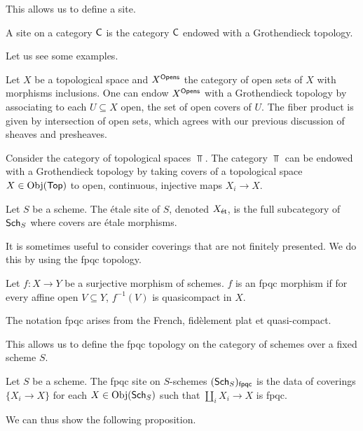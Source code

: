 This allows us to define a site. 
\begin{definition}[Site]\label{def: site}
    A site on a category $\mathsf{C}$ is the category $\mathsf{C}$ endowed with a Grothendieck topology. 
\end{definition}
Let us see some examples.
\begin{example}
    Let $X$ be a topological space and $X^{\mathsf{Opens}}$ the category of open sets of $X$ with morphisms inclusions. One can endow $X^{\mathsf{Opens}}$ with a Grothendieck topology by associating to each $U\subseteq X$ open, the set of open covers of $U$. The fiber product is given by intersection of open sets, which agrees with our previous discussion of sheaves and presheaves. 
\end{example}
\begin{example}
    Consider the category of topological spaces $\Top$. The category $\Top$ can be endowed with a Grothendieck topology by taking covers of a topological space $X\in\mathrm{Obj}(\mathsf{Top})$ to open, continuous, injective maps $X_{i}\to X$. 
\end{example}
\begin{example}
    Let $S$ be a scheme. The \'{e}tale site of $S$, denoted $X_{\mathsf{\acute{e}t}}$, is the full subcategory of $\mathsf{Sch}_{S}$ where covers are \'{e}tale morphisms. 
\end{example}
It is sometimes useful to consider coverings that are not finitely presented. We do this by using the fpqc topology. 
\begin{definition}\label{def: fpqc morphism}
    Let $f:X\to Y$ be a surjective morphism of schemes. $f$ is an fpqc morphism if for every affine open $V\subseteq Y$, $f^{-1}(V)$ is quasicompact in $X$.
\end{definition}
\begin{remark}
    The notation fpqc arises from the French, fid\`{e}lement plat et quasi-compact. 
\end{remark}
This allows us to define the fpqc topology on the category of schemes over a fixed scheme $S$. 
\begin{definition}\label{def: fpqc site}
    Let $S$ be a scheme. The fpqc site on $S$-schemes $(\mathsf{Sch}_{S})_{\mathsf{fpqc}}$ is the data of coverings $\{X_{i}\to X\}$ for each $X\in\mathrm{Obj}(\mathsf{Sch}_{S})$ such that $\coprod_{i}X_{i}\to X$ is fpqc. 
\end{definition}
We can thus show the following proposition. 
